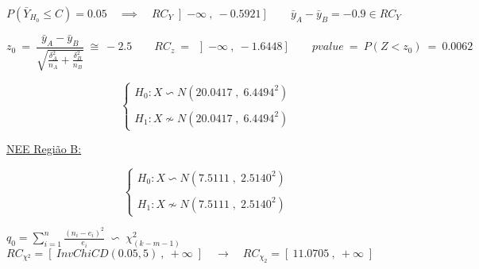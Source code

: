 \newline
\vspace{1cm}
\newline
$P(\bar{Y}_{H_0} \leqslant C)=0.05 \quad \implies \quad RC_Y\left] -\infty \:,\: -0.5921 \right] \qquad \bar{y}_A-\bar{y}_B=-0.9 \in RC_Y $
\newline
\vspace{1cm}
\newline
\begin{minipage}[l]{0pt}
	\[  z_0\:=\: \frac{\bar{y}_A-\bar{y}_B}{\sqrt{\frac{\delta_A^2}{n_A}+\frac{\delta_B^2}{n_B}}}\:\cong\: -2.5 \qquad
	RC_z \:=\: \left] -\infty \:,\: -1.6448 \right]  \qquad
	pvalue \:=\: P(Z<z_0) \:=\: 0.0062 \]
\end{minipage}
\newline
\vspace{1cm}
\newline
\begin{minipage}[l]{0pt}
	$$\left\lbrace\begin{array}{l}
		H_0: X \backsim N (20.0417\;,\;6.4494^2) \\
		\\
		H_1: X \nsim N (20.0417\;,\;6.4494^2)
	\end{array}\right.$$
\end{minipage}
\newline
\vspace{1cm}
\newline
\hspace*{5cm} \underline{NEE Região B:} \\
\begin{minipage}[l]{0pt}
	$$\left\lbrace\begin{array}{l}
		H_0: X \backsim N (7.5111\;,\;2.5140^2) \\
		\\
		H_1: X \nsim N (7.5111\;,\;2.5140^2)
	\end{array}\right.$$
\end{minipage}
\newline
\vspace{1cm}
\newline
$q_0=\sum_{i=1}^n \frac{(n_i-e_i)^2}{e_i} \;\backsim\; \chi_{(k-m-1)}^2$
\newline
\vspace{1cm}
\newline
$RC_{\chi^2}=\left[ \: InvChiCD(0.05,5) \:,\: +\infty \; \right] \quad \rightarrow \quad RC_{\chi_2}=\left[ \: 11.0705 \:,\: +\infty \; \right]$
\newline
